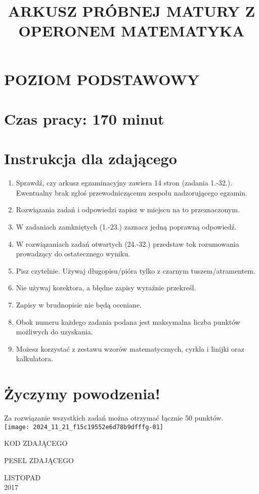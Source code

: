 \documentclass[10pt]{article}
\title{ARKUSZ PRÓBNEJ MATURY Z OPERONEM MATEMATYKA }
\author{}
\date{}
\begin{document}
\maketitle
\section*{POZIOM PODSTAWOWY}
\section*{Czas pracy: 170 minut}
\section*{Instrukcja dla zdającego}
\begin{enumerate}
  \item Sprawdź, czy arkusz egzaminacyjny zawiera 14 stron (zadania 1.-32.). Ewentualny brak zgłoś przewodniczącemu zespołu nadzorującego egzamin.
  \item Rozwiązania zadań i odpowiedzi zapisz w miejscu na to przeznaczonym.
  \item W zadaniach zamkniętych (1.-23.) zaznacz jedną poprawną odpowiedź.
  \item W rozwiązaniach zadań otwartych (24.-32.) przedstaw tok rozumowania prowadzący do ostatecznego wyniku.
  \item Pisz czytelnie. Używaj długopisu/pióra tylko z czarnym tuszem/atramentem.
  \item Nie używaj korektora, a błędne zapisy wyraźnie przekreśl.
  \item Zapisy w brudnopisie nie będą oceniane.
  \item Obok numeru każdego zadania podana jest maksymalna liczba punktów możliwych do uzyskania.
  \item Możesz korzystać z zestawu wzorów matematycznych, cyrkla i linijki oraz kalkulatora.
\end{enumerate}

\section*{Życzymy powodzenia!}
Za rozwiązanie wszystkich zadań można otrzymać łącznie 50 punktów.\\
\texttt{[image: 2024\_11\_21\_f15c19552e6d78b9dfffg-01]}

KOD ZDAJĄCEGO

PESEL ZDAJĄCEGO

LISTOPAD\\
2017
\end{document}
